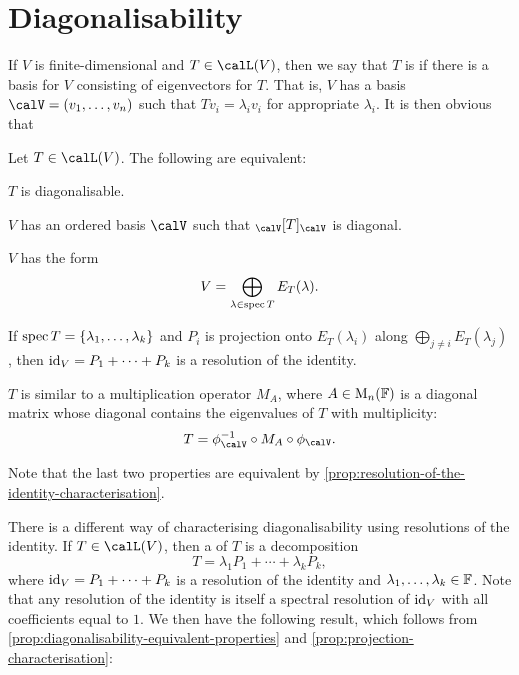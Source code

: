 \section{Diagonalisability}\label{par:diagonalisability}

If $V$ is finite-dimensional and $T \in \lin(V)$, then we say that $T$ is  if there is a basis for $V$ consisting of eigenvectors for $T$. That is, $V$ has a basis $\calV = (v_1, \ldots, v_n)$ such that $Tv_i = \lambda_i v_i$ for appropriate $\lambda_i$. It is then obvious that

\begin{propositionnoproof}
    \label{prop:diagonalisability-equivalent-properties}
    Let $T \in \lin(V)$. The following are equivalent:
    \begin{enumproposition}
        \item $T$ is diagonalisable.
        
        \item $V$ has an ordered basis $\calV$ such that $\mr{\calV}{T}{\calV}$ is diagonal.
        
        \item $V$ has the form
        \begin{equation*}
            V
                = \bigoplus_{\lambda \in \operatorname{spec} T} E_T(\lambda).
        \end{equation*}
        
        \item If $\operatorname{spec} T = \{\lambda_1, \ldots, \lambda_k\}$ and $P_i$ is projection onto $E_T(\lambda_i)$ along $\bigoplus_{j \neq i} E_T(\lambda_j)$, then $\operatorname{id}_V = P_1 + \cdots + P_k$ is a resolution of the identity.
        
        \item $T$ is similar to a multiplication operator $M_A$, where $A \in \mathrm{M}_{n}(\mathbb{F})$ is a diagonal matrix whose diagonal contains the eigenvalues of $T$ with multiplicity:
        \begin{equation*}
            T
                = \inv{\coordmap{\calV}} \circ M_A \circ \coordmap{\calV}.
        \end{equation*}
    \end{enumproposition}
\end{propositionnoproof}
%
Note that the last two properties are equivalent by \cref{prop:resolution-of-the-identity-characterisation}.


There is a different way of characterising diagonalisability using resolutions of the identity. If $T \in \lin(V)$, then a  of $T$ is a decomposition
%
\begin{equation*}
    T
        = \lambda_1 P_1 + \cdots + \lambda_k P_k,
\end{equation*}
%
where $\operatorname{id}_V = P_1 + \cdots + P_k$ is a resolution of the identity and $\lambda_1, \ldots, \lambda_k \in \mathbb{F}$. Note that any resolution of the identity is itself a spectral resolution of $\operatorname{id}_V$ with all coefficients equal to $1$. We then have the following result, which follows from \cref{prop:diagonalisability-equivalent-properties} and \cref{prop:projection-characterisation}:

